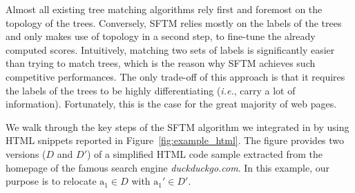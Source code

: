 \documentclass[preprint, 12pt]{elsarticle}
\begin{document}
Almost all existing tree matching algorithms rely first and foremost on the topology of the trees.
Conversely, SFTM relies mostly on the labels of the trees and only makes use of topology in a second step, to fine-tune the already computed scores. Intuitively, matching two sets of labels is significantly easier than trying to match trees, which is the reason why SFTM achieves such competitive performances.
The only trade-off of this approach is that it requires the labels of the trees to be highly differentiating (\emph{i.e.}, carry a lot of information). 
Fortunately, this is the case for the great majority of web pages.

We walk through the key steps of the SFTM algorithm we integrated in \erratum{} by using HTML snippets reported in Figure~\ref{fig:example_html}.
The figure provides two versions ($D$ and $D'$) of a simplified HTML code sample extracted from the homepage of the famous search engine \textit{duckduckgo.com}.
In this example, our purpose is to relocate $\text{a}_1 \in D$ with $\text{a}_1' \in D'$.
\end{document}
